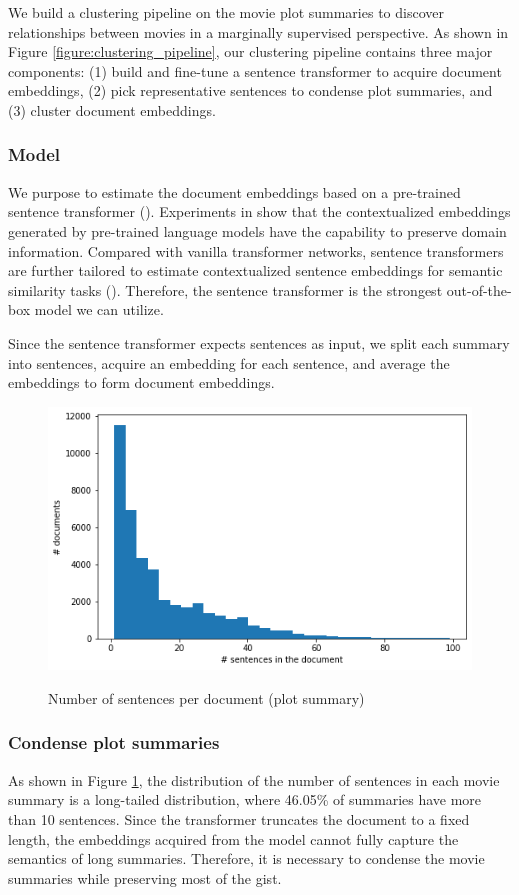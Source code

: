 \documentclass{article}
\begin{document}
\begin{multicols}{2}
We build a clustering pipeline on the movie plot summaries to discover relationships between movies in a marginally supervised perspective. As shown in Figure \ref{figure:clustering_pipeline}, our clustering pipeline contains three major components: (1) build and fine-tune a sentence transformer to acquire document embeddings, (2) pick representative sentences to condense plot summaries, and (3) cluster document embeddings.

\subsubsection{Model}
We purpose to estimate the document embeddings based on a pre-trained sentence transformer (\cite{reimers-gurevych-2019-sentence}). Experiments in \cite{aharoni-goldberg-2020-unsupervised} show that the contextualized embeddings generated by pre-trained language models have the capability to preserve domain information. Compared with vanilla transformer networks, sentence transformers are further tailored to estimate contextualized sentence embeddings for semantic similarity tasks (\cite{reimers-gurevych-2019-sentence}). Therefore, the sentence transformer is the strongest out-of-the-box model we can utilize.

Since the sentence transformer expects sentences as input, we split each summary into sentences, acquire an embedding for each sentence, and average the embeddings to form document embeddings.

\begin{figure}
\caption{Number of sentences per document (plot summary)}
\centering
\includegraphics[width=5in]{figures/sents_per_doc.png}
\label{figure:sents_per_doc}
\end{figure}

\subsubsection{Condense plot summaries}
As shown in Figure \ref{figure:sents_per_doc}, the distribution of the number of sentences in each movie summary is a long-tailed distribution, where 46.05\% of summaries have more than 10 sentences. Since the transformer truncates the document to a fixed length, the embeddings acquired from the model cannot fully capture the semantics of long summaries. Therefore, it is necessary to condense the movie summaries while preserving most of the gist.


\end{multicols}
\end{document}
